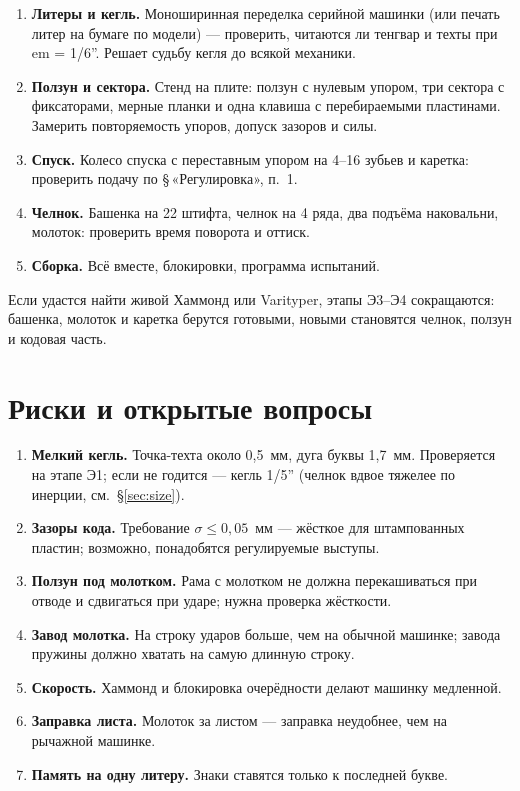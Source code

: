 \begin{enumerate}[label=Э\arabic*.]
  \item \textbf{Литеры и кегль.} Моноширинная переделка серийной машинки (или печать литер на бумаге по модели) — проверить, читаются ли тенгвар и техты при em = 1/6''. Решает судьбу кегля до всякой механики.
  \item \textbf{Ползун и сектора.} Стенд на плите: ползун с нулевым упором, три сектора с фиксаторами, мерные планки и одна клавиша с перебираемыми пластинами. Замерить повторяемость упоров, допуск зазоров и силы.
  \item \textbf{Спуск.} Колесо спуска с переставным упором на 4--16 зубьев и каретка: проверить подачу по \S\,«Регулировка», п.~1.
  \item \textbf{Челнок.} Башенка на 22 штифта, челнок на 4 ряда, два подъёма наковальни, молоток: проверить время поворота и оттиск.
  \item \textbf{Сборка.} Всё вместе, блокировки, программа испытаний.
\end{enumerate}

Если удастся найти живой Хаммонд или Varityper, этапы Э3--Э4 сокращаются: башенка, молоток и каретка берутся готовыми, новыми становятся челнок, ползун и кодовая часть.

\section{Риски и открытые вопросы}

\begingroup\sloppy
\begin{enumerate}[label=Р\arabic*.]
  \item \textbf{Мелкий кегль.} Точка-техта около 0,5~мм, дуга буквы 1,7~мм. Проверяется на этапе Э1; если не годится — кегль 1/5'' (челнок вдвое тяжелее по инерции, см.~\S\ref{sec:size}).
  \item \textbf{Зазоры кода.} Требование $\sigma \le 0{,}05$~мм — жёсткое для штампованных пластин; возможно, понадобятся регулируемые выступы.
  \item \textbf{Ползун под молотком.} Рама с молотком не должна перекашиваться при отводе и сдвигаться при ударе; нужна проверка жёсткости.
  \item \textbf{Завод молотка.} На строку ударов больше, чем на обычной машинке; завода пружины должно хватать на самую длинную строку.
  \item \textbf{Скорость.} Хаммонд и блокировка очерёдности делают машинку медленной.
  \item \textbf{Заправка листа.} Молоток за листом — заправка неудобнее, чем на рычажной машинке.
  \item \textbf{Память на одну литеру.} Знаки ставятся только к последней букве.
\end{enumerate}
\endgroup

